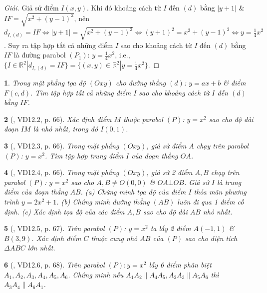 \documentclass{article}
\newtheorem{baitoan}{}
\begin{document}
\begin{proof}[Giải]
	Giả sử điểm $I(x,y)$. Khi đó khoảng cách từ $I$ đến $(d)$ bằng $|y + 1|$ \& $IF = \sqrt{x^2 + (y - 1)^2}$, nên $d_{I,(d)} = IF\Leftrightarrow|y + 1| = \sqrt{x^2 + (y - 1)^2}\Leftrightarrow(y + 1)^2 = x^2 + (y - 1)^2\Leftrightarrow y = \frac{1}{4}x^2$. Suy ra tập hợp tất cả những điểm $I$ sao cho khoảng cách từ $I$ đến $(d)$ bằng $IF$ là đường parabol $(P_1)$: $y = \frac{1}{4}x^2$, i.e., $\{I\in\mathbb{R}^2|d_{I,(d)} = IF\} = \{(x,y)\in\mathbb{R}^2|y = \frac{1}{4}x^2\}$.
\end{proof}

\begin{baitoan}
	Trong mặt phẳng tọa độ $(Oxy)$ cho đường thẳng $(d)$: $y = ax + b$ \& điểm $F(c,d)$. Tìm tập hợp tất cả những điểm $I$ sao cho khoảng cách từ $I$ đến $(d)$ bằng $IF$.
\end{baitoan}

\begin{baitoan}[\cite{TLCT_THCS_Toan_9_dai_so}, VD12.2, p. 66]
	Xác định điểm $M$ thuộc parabol $(P)$: $y = x^2$ sao cho độ dài đoạn $IM$ là nhỏ nhất, trong đó $I(0,1)$.
\end{baitoan}

\begin{baitoan}[\cite{TLCT_THCS_Toan_9_dai_so}, VD12.3, p. 66]
	Trong mặt phẳng $(Oxy)$, giả sử điểm $A$ chạy trên parabol $(P)$: $y = x^2$. Tìm tập hợp trung điểm $I$ của đoạn thẳng $OA$.
\end{baitoan}

\begin{baitoan}[\cite{TLCT_THCS_Toan_9_dai_so}, VD12.4, p. 66]
	Trong mặt phẳng $(Oxy)$, giả sử 2 điểm $A,B$ chạy trên parabol $(P)$: $y = x^2$ sao cho $A,B\ne O(0,0)$ \& $OA\bot OB$. Giả sử $I$ là trung điểm của đoạn thẳng $AB$. (a) Chứng minh tọa độ của điểm $I$ thỏa mãn phương trình $y = 2x^2 + 1$. (b) Chứng minh đường thẳng $(AB)$ luôn đi qua 1 điểm cố định. (c) Xác định tọa độ của các điểm $A,B$ sao cho độ dài $AB$ nhỏ nhất.
\end{baitoan}

\begin{baitoan}[\cite{TLCT_THCS_Toan_9_dai_so}, VD12.5, p. 67]
	Trên parabol $(P)$: $y = x^2$ ta lấy 2 điểm $A(-1,1)$ \& $B(3,9)$. Xác định điểm $C$ thuộc cung nhỏ $AB$ của $(P)$ sao cho diện tích $\Delta ABC$ lớn nhất.
\end{baitoan}

\begin{baitoan}[\cite{TLCT_THCS_Toan_9_dai_so}, VD12.6, p. 68]
	Trên parabol $(P):y = x^2$ lấy 6 điểm phân biệt $A_1,A_2,A_3,A_4,A_5,A_6$. Chứng minh nếu $A_1A_2\parallel A_4A_5,A_2A_3\parallel A_5A_6$ thì $A_3A_4\parallel A_6A_1$.
\end{baitoan}
\end{document}
